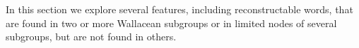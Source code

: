 In this section we explore several features,
including reconstructable words,
that are found in two or more Wallacean subgroups or in limited
nodes of several subgroups,
but are not found in others.